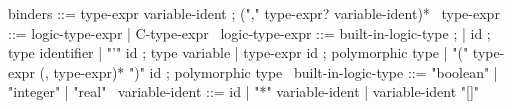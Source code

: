 \begin{syntax}
  binders ::= type-expr variable-ident ;
  ("," type-expr? variable-ident)*
  \
  type-expr ::= logic-type-expr | C-type-expr
  \
  logic-type-expr ::= built-in-logic-type ;
  | id ; type identifier
  | "'" id ; type variable
  | type-expr id ; polymorphic type                 
  | "(" type-expr (, type-expr)* ")" id ; polymorphic type
  \
  built-in-logic-type ::= "boolean" | "integer" | "real" 
  \
  variable-ident ::= id 
  | "*" variable-ident 
  | variable-ident "[]"
\end{syntax}